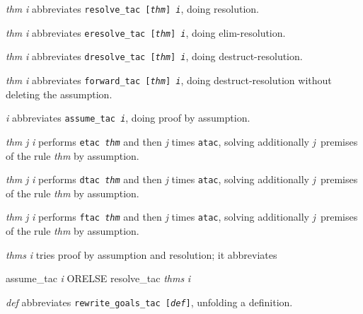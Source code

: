 \begin{ttdescription}
\item[\ttindexbold{rtac} {\it thm} {\it i}] 
abbreviates \hbox{\tt resolve_tac [{\it thm}] {\it i}}, doing resolution.

\item[\ttindexbold{etac} {\it thm} {\it i}] 
abbreviates \hbox{\tt eresolve_tac [{\it thm}] {\it i}}, doing elim-resolution.

\item[\ttindexbold{dtac} {\it thm} {\it i}] 
abbreviates \hbox{\tt dresolve_tac [{\it thm}] {\it i}}, doing
destruct-resolution.

\item[\ttindexbold{ftac} {\it thm} {\it i}] 
abbreviates \hbox{\tt forward_tac [{\it thm}] {\it i}}, doing
destruct-resolution without deleting the assumption.

\item[\ttindexbold{atac} {\it i}] 
abbreviates \hbox{\tt assume_tac {\it i}}, doing proof by assumption.

\item[\ttindexbold{eatac} {\it thm} {\it j} {\it i}] 
performs \hbox{\tt etac {\it thm}} and then {\it j} times \texttt{atac}, 
solving additionally {\it j}~premises of the rule {\it thm} by assumption.

\item[\ttindexbold{datac} {\it thm} {\it j} {\it i}] 
performs \hbox{\tt dtac {\it thm}} and then {\it j} times \texttt{atac}, 
solving additionally {\it j}~premises of the rule {\it thm} by assumption.

\item[\ttindexbold{fatac} {\it thm} {\it j} {\it i}] 
performs \hbox{\tt ftac {\it thm}} and then {\it j} times \texttt{atac}, 
solving additionally {\it j}~premises of the rule {\it thm} by assumption.

\item[\ttindexbold{ares_tac} {\it thms} {\it i}] 
tries proof by assumption and resolution; it abbreviates
\begin{ttbox}
assume_tac {\it i} ORELSE resolve_tac {\it thms} {\it i}
\end{ttbox}

\item[\ttindexbold{rewtac} {\it def}] 
abbreviates \hbox{\tt rewrite_goals_tac [{\it def}]}, unfolding a definition.
\end{ttdescription}



